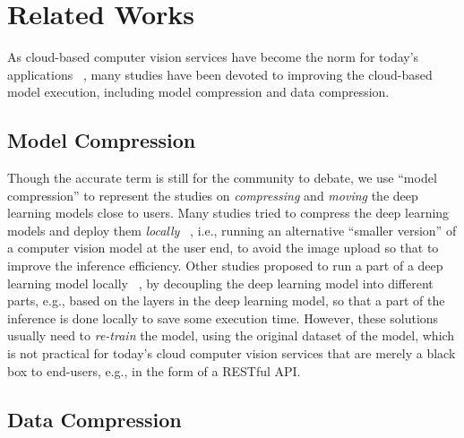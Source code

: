 \section{Related Works}
\label{sec: related_works}

As cloud-based computer vision services have become the norm for today's applications ~\cite{huynh2017deepmon, agrawal2015cloudcv}, many studies have been devoted to improving the cloud-based model execution, including model compression and data compression.

\subsection{Model Compression}

Though the accurate term is still for the community to debate, we use ``model compression'' to represent the studies on {\em compressing} and {\em moving} the deep learning models close to users. Many studies tried to compress the deep learning models and deploy them \emph{locally} ~\cite{prun_quanti, pruning_han, quantize, quantize_3bit, quantization, structured_pruning}, i.e., running an alternative ``smaller version'' of a computer vision model at the user end, to avoid the image upload so that to improve the inference efficiency. Other studies proposed to run a part of a deep learning model locally ~\cite{ILP_Decoupling, jalad, Edge_LBP, Neurosurgeon}, by decoupling the deep learning model into different parts, e.g., based on the layers in the deep learning model, so that a part of the inference is done locally to save some execution time. However, these solutions usually need to \emph{re-train} the model, using the original dataset of the model, which is not practical for today's cloud computer vision services that are merely a black box to end-users, e.g., in the form of a RESTful API.

\subsection{Data Compression}

